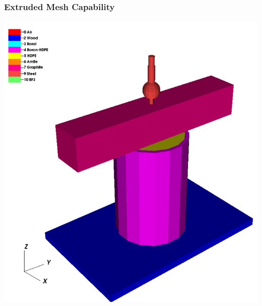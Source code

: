 \documentclass[compress]{beamer}
\begin{document}
\begin{frame}[t]\frametitle{Extruded Mesh Capability}
\centering
\includegraphics[scale=0.25]{figures/IM1_3D_extrude.png}
\end{frame}
\end{document}
